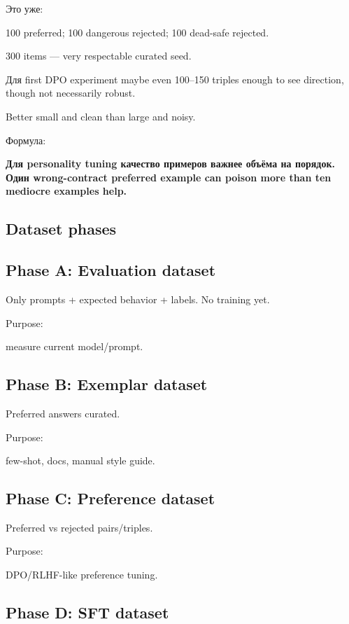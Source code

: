 Это уже:

100 preferred; 100 dangerous rejected; 100 dead-safe rejected.

300 items --- very respectable curated seed.

Для first DPO experiment maybe even 100--150 triples enough to see
direction, though not necessarily robust.

Better small and clean than large and noisy.

Формула:

\textbf{Для personality tuning качество примеров важнее объёма на
порядок. Один wrong-contract preferred example can poison more than ten
mediocre examples help.}

\subsection*{Dataset phases}

\subsection*{Phase A: Evaluation dataset}

Only prompts + expected behavior + labels. No training yet.

Purpose:

measure current model/\hspace{0pt}prompt.

\subsection*{Phase B: Exemplar dataset}

Preferred answers curated.

Purpose:

few-shot, docs, manual style guide.

\subsection*{Phase C: Preference dataset}

Preferred vs rejected pairs/\hspace{0pt}triples.

Purpose:

DPO/\hspace{0pt}RLHF-like preference tuning.

\subsection*{Phase D: SFT dataset}

